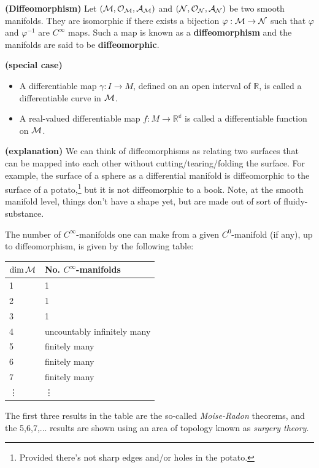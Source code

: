 \documentclass[12pt]{article} %
\newcommand{\bfs}[1]{\textbf{({#1}) }}
\begin{document}
\bd\bfs{Diffeomorphism}
    Let $(\mathcal{M},\mathcal{O}_{\mathcal{M}},\mathcal{A}_{\mathcal{M}})$ and $(\mathcal{N},\mathcal{O}_{\mathcal{N}},\mathcal{A}_{\mathcal{N}})$ be two smooth manifolds. They are isomorphic if there exists a bijection $\varphi:\mathcal{M}\to \mathcal{N}$ such that $\varphi$ and $\varphi^{-1}$ are $C^{\infty}$ maps. Such a map is known as a \textbf{diffeomorphism} and the manifolds are said to be \textbf{diffeomorphic}.
\ed 
\begin{exma}\bfs{special case}
\begin{itemize}
    \item A differentiable map $\gamma: I \rightarrow M$, defined on an open interval of $\mathbb{R}$, is called a differentiable curve in $\mathcal{M}$. 
    \item A real-valued differentiable map $f: M \rightarrow \mathbb{R^d}$ is called a differentiable function on $\mathcal{M}$. 
\end{itemize}
\end{exma}
\begin{rema}\bfs{explanation}
We can think of diffeomorphisms as relating two surfaces that can be mapped into each other without cutting/tearing/folding the surface. For example, the surface of a sphere as a differential manifold is diffeomorphic to the surface of a potato,\footnote{Provided there's not sharp edges and/or holes in the potato.} but it is not diffeomorphic to a book. Note, at the smooth manifold level, things don't have a shape yet, but are made out of sort of fluidy-substance.
\end{rema}
\bt 
    The number of $C^{\infty}$-manifolds one can make from a given $C^0$-manifold (if any), up to diffeomorphism, is given by the following table:
    \begin{center}
	    \begin{tabular}{@{} p{2.5cm}p{5cm}@{}}
		    \toprule
		    $\dim\mathcal{M}$ & No. $C^{\infty}$-manifolds \\
		    \midrule 
		    1 & 1 \\
		    2 & 1 \\
		    3 & 1 \\
		    4 &  uncountably infinitely many\\
		    5 & finitely many \\
		    6 & finitely many \\
		    7 & finitely many \\
		    \vdots & \vdots \\
		    \bottomrule
	    \end{tabular}
    \end{center}
\et 
\begin{rema}
The first three results in the table are the so-called \textit{Moise-Radon} theorems, and the 5,6,7,... results are shown using an area of topology known as \textit{surgery theory}.
\end{rema}
\end{document}
